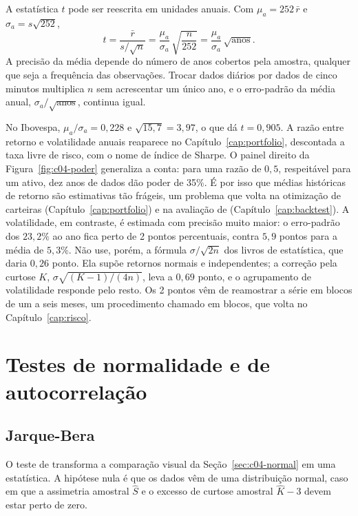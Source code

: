 \begin{intuicao}
A estatística $t$ pode ser reescrita em unidades anuais. Com $\mu_a = 252\,\bar r$ e $\sigma_a = s\sqrt{252}$,
\[
  t = \frac{\bar r}{s/\sqrt{n}} = \frac{\mu_a}{\sigma_a}\,\sqrt{\frac{n}{252}} = \frac{\mu_a}{\sigma_a}\,\sqrt{\text{anos}} .
\]
A precisão da média depende do número de anos cobertos pela amostra, qualquer que seja a frequência das observações. Trocar dados diários por dados de cinco minutos multiplica $n$ sem acrescentar um único ano, e o erro-padrão da média anual, $\sigma_a/\sqrt{\text{anos}}$, continua igual.
\end{intuicao}

No Ibovespa, $\mu_a/\sigma_a = 0,228$ e $\sqrt{15,7} = 3,97$, o que dá $t = 0,905$. A razão entre retorno e volatilidade anuais reaparece no Capítulo~\ref{cap:portfolio}, descontada a taxa livre de risco, com o nome de índice de Sharpe. O painel direito da Figura~\ref{fig:c04-poder} generaliza a conta: para uma razão de $0,5$, respeitável para um ativo, dez anos de dados dão poder de 35\%. É por isso que médias históricas de retorno são estimativas tão frágeis, um problema que volta na otimização de carteiras (Capítulo~\ref{cap:portfolio}) e na avaliação de  (Capítulo~\ref{cap:backtest}). A volatilidade, em contraste, é estimada com precisão muito maior: o erro-padrão dos $23,2\%$ ao ano fica perto de 2 pontos percentuais, contra $5,9$ pontos para a média de $5,3\%$. Não use, porém, a fórmula $\sigma/\sqrt{2n}$ dos livros de estatística, que daria $0,26$ ponto. Ela supõe retornos normais e independentes; a correção pela curtose $K$, $\sigma\sqrt{(K-1)/(4n)}$, leva a $0,69$ ponto, e o agrupamento de volatilidade responde pelo resto. Os 2 pontos vêm de reamostrar a série em blocos de um a seis meses, um procedimento chamado  em blocos, que volta no Capítulo~\ref{cap:risco}.

\section{Testes de normalidade e de autocorrelação}
\label{sec:c04-jb-lb}

\subsection{Jarque-Bera}

O teste de \citet{jarque1987} transforma a comparação visual da Seção~\ref{sec:c04-normal} em uma estatística. A hipótese nula é que os dados vêm de uma distribuição normal, caso em que a assimetria amostral $\hat S$ e o excesso de curtose amostral $\hat K - 3$ devem estar perto de zero.

